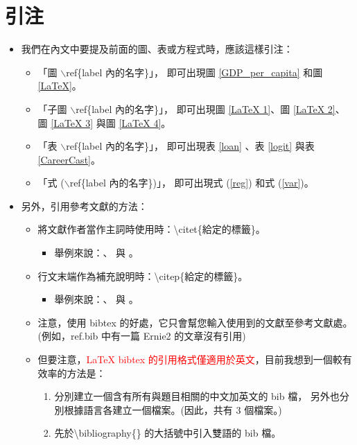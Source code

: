 \documentclass[utf8,12pt]{article} %
\begin{document}
\section{引注}
%
%
\begin{spacing}{1.5}
%
\begin{itemize}
	\item 我們在內文中要提及前面的圖、表或方程式時，應該這樣引注：
	\begin{itemize}
		\item 「圖 $\backslash$ref\{label 內的名字\}」，
			即可出現圖 \ref{GDP_per_capita} 和圖 \ref{LaTeX}。
		\item 「子圖 $\backslash$ref\{label 內的名字\}」，
			即可出現圖 \ref{LaTeX 1}、圖 \ref{LaTeX 2}、圖 \ref{LaTeX 3} 與圖 \ref{LaTeX 4}。
		\item 「表 $\backslash$ref\{label 內的名字\}」，
			即可出現表 \ref{loan} 、表 \ref{logit} 與表 \ref{CareerCast}。
		\item 「式 ($\backslash$ref\{label 內的名字\})」，
				即可出現式 (\ref{reg}) 和式 (\ref{var})。
	\end{itemize}
	\item 另外，引用參考文獻的方法：
	\begin{itemize}
		\item 將文獻作者當作主詞時使用時：\textbackslash citet\{給定的標籤\}。
		\begin{itemize}
			\item 舉例來說：\citet{Ernie1}、\citet{melitz2003} 與 \citet{sin1996}。
		\end{itemize}	
		\item 行文末端作為補充說明時：\textbackslash citep\{給定的標籤\}。
		\begin{itemize}
			\item 舉例來說：\citep{Ernie1}、\citep{melitz2003} 與 \citep{sin1996}。
		\end{itemize}
		\item 注意，使用 bibtex 的好處，它只會幫您輸入使用到的文獻至參考文獻處。(例如，ref.bib 中有一篇 Ernie2 的文章沒有引用)
		\item 但要注意，\textcolor{red}{\LaTeX{} bibtex 的引用格式僅適用於英文}，目前我想到一個較有效率的方法是：
		\begin{enumerate}[1]
			\item 分別建立一個含有所有與題目相關的中文加英文的 bib 檔，
			另外也分別根據語言各建立一個檔案。(因此，共有 3 個檔案。)
			\item 先於\textbackslash bibliography\{\} 的大括號中引入雙語的 bib 檔。

\end{enumerate}
\end{itemize}
\end{itemize}
\end{spacing}
\end{document}
